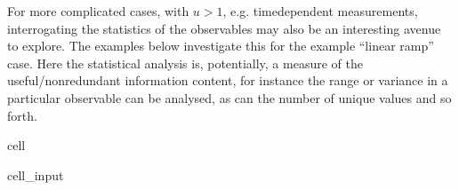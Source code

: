 \documentclass[letterpaper,table,10pt,english]{jupyterBook}
\begin{document}
\sphinxAtStartPar
For more complicated cases, with \(u>1\), e.g. time\sphinxhyphen{}dependent measurements, interrogating the statistics of the observables may also be an interesting avenue to explore. The examples below investigate this for the example “linear ramp” {\hyperref[\detokenize{backmatter/glossary:term-ADMs}]{}} case. Here the statistical analysis is, potentially, a measure of the useful/non\sphinxhyphen{}redundant information content, for instance the range or variance in a particular observable can be analysed, as can the number of unique values and so forth.

\begin{sphinxuseclass}{cell}\begin{sphinxVerbatimInput}

\begin{sphinxuseclass}{cell_input}
\begin{sphinxVerbatim}[commandchars=\\\{\}]
     

   
\end{sphinxVerbatim}

\end{sphinxuseclass}\end{sphinxVerbatimInput}
\begin{sphinxVerbatimOutput}


\end{sphinxVerbatimOutput}
\end{sphinxuseclass}
\end{document}

